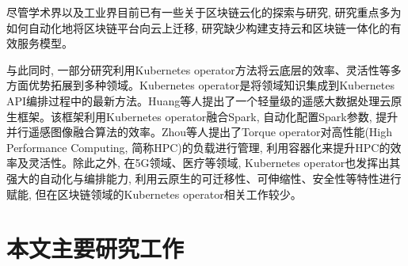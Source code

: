 尽管学术界以及工业界目前已有一些关于区块链云化的探索与研究, 研究重点多为如何自动化地将区块链平台向云上迁移, 研究缺少构建支持云和区块链一体化的有效服务模型\cite{9582270}。

与此同时, 一部分研究利用Kubernetes operator方法将云底层的效率、灵活性等多方面优势拓展到多种领域。Kubernetes operator是将领域知识集成到Kubernetes API编排过程中的最新方法\cite{henning2021reproducible}。Huang等人\cite{huang2021fly}提出了一个轻量级的遥感大数据处理云原生框架。该框架利用Kubernetes operator融合Spark, 自动化配置Spark参数, 提升并行遥感图像融合算法的效率。Zhou等人\cite{zhou2021container}提出了Torque operator对高性能(High Performance Computing, 简称HPC)的负载进行管理, 利用容器化来提升HPC的效率及灵活性。除此之外, 在5G领域\cite{arouk20205g}\cite{wiranata2020automation}、医疗\cite{rouzbeh2020unified}等领域, Kubernetes operator也发挥出其强大的自动化与编排能力, 利用云原生的可迁移性、可伸缩性、安全性等特性进行赋能, 但在区块链领域的Kubernetes operator相关工作较少。


\section{本文主要研究工作}








